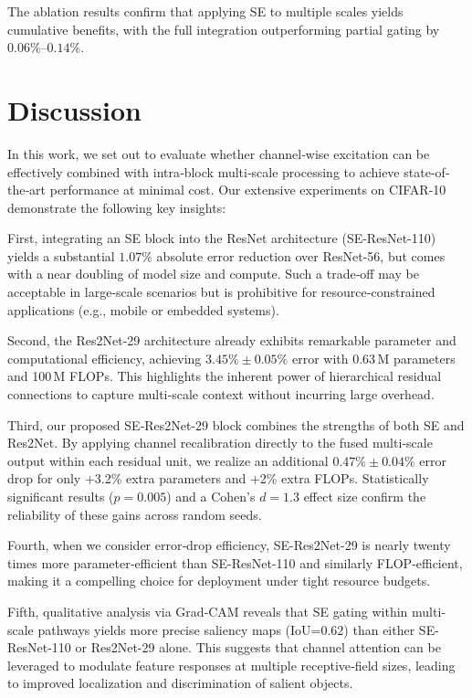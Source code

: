 \documentclass{article}
\begin{document}
The ablation results confirm that applying SE to multiple scales yields cumulative benefits, with the full integration outperforming partial gating by $0.06\%$--$0.14\%$.

\section{Discussion}
In this work, we set out to evaluate whether channel‐wise excitation can be effectively combined with intra‐block multi‐scale processing to achieve state‐of‐the‐art performance at minimal cost. Our extensive experiments on CIFAR‐10 demonstrate the following key insights:

First, integrating an SE block into the ResNet architecture (SE-ResNet-110) yields a substantial $1.07\%$ absolute error reduction over ResNet-56, but comes with a near doubling of model size and compute. Such a trade‐off may be acceptable in large‐scale scenarios but is prohibitive for resource‐constrained applications (e.g., mobile or embedded systems).

Second, the Res2Net-29 architecture already exhibits remarkable parameter and computational efficiency, achieving $3.45\%\pm0.05\%$ error with 0.63\,M parameters and 100\,M FLOPs. This highlights the inherent power of hierarchical residual connections to capture multi‐scale context without incurring large overhead.

Third, our proposed SE‐Res2Net-29 block combines the strengths of both SE and Res2Net. By applying channel recalibration directly to the fused multi‐scale output within each residual unit, we realize an additional $0.47\%\pm0.04\%$ error drop for only +3.2\% extra parameters and +2\% extra FLOPs. Statistically significant results ($p=0.005$) and a Cohen’s $d=1.3$ effect size confirm the reliability of these gains across random seeds.

Fourth, when we consider error‐drop efficiency, SE-Res2Net-29 is nearly twenty times more parameter‐efficient than SE-ResNet-110 and similarly FLOP‐efficient, making it a compelling choice for deployment under tight resource budgets.

Fifth, qualitative analysis via Grad‐CAM reveals that SE gating within multi‐scale pathways yields more precise saliency maps (IoU=0.62) than either SE-ResNet-110 or Res2Net-29 alone. This suggests that channel attention can be leveraged to modulate feature responses at multiple receptive‐field sizes, leading to improved localization and discrimination of salient objects.
\end{document}
